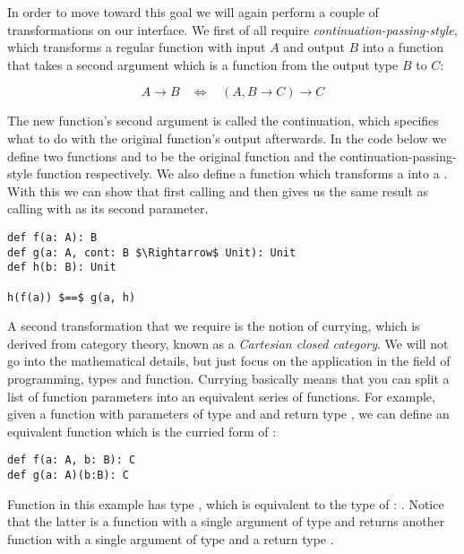 In order to move toward this goal we will again perform a couple of transformations on our \comp interface. We first of all require \textit{continuation-passing-style}, which transforms a regular function with input $A$ and output $B$ into a function that takes a second argument which is a function from the output type $B$ to $C$:

\[A \rightarrow B \ \ \ \ \Leftrightarrow \ \ \ \ (A, B \rightarrow C) \rightarrow C\]

The new function's second argument is called the continuation, which specifies what to do with the original function's output afterwards. In the code below we define two functions  and  to be the original function and the continuation-passing-style function respectively. We also define a function  which transforms a  into a . With this we can show that first calling  and then  gives us the same result as calling  with  as its second parameter.

\begin{lstlisting}[style=InlineScalaStyle]
def f(a: A): B
def g(a: A, cont: B $\Rightarrow$ Unit): Unit
def h(b: B): Unit

h(f(a)) $==$ g(a, h)
\end{lstlisting}

A second transformation that we require is the notion of currying, which is derived from category theory, known as a \textit{Cartesian closed category}. We will not go into the mathematical details, but just focus on the application in the field of programming, types and function. Currying basically means that you can split a list of function parameters into an equivalent series of functions. For example, given a function  with parameters of type  and  and return type , we can define an equivalent function  which is the curried form of :

\begin{lstlisting}[style=InlineScalaStyle]
def f(a: A, b: B): C
def g(a: A)(b:B): C
\end{lstlisting}

Function  in this example has type , which is equivalent to the type of : . Notice that the latter is a function with a single argument of type  and returns another function with a single argument of type  and a return type .

